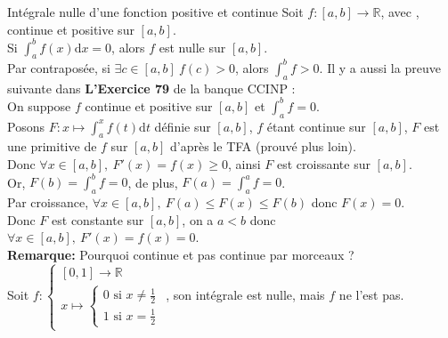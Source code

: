 \documentclass[11pt]{article}
\newcommand*{\R}{\mathbb{R}}
\newcommand{\0}{\varnothing}
\newcommand*{\n}{\\[0.2cm]}
\newcommand{\dx}{\textrm{d}x}
\newcommand{\dt}{\textrm{d}t}
\begin{document}
\begin{prop}{Intégrale nulle d'une fonction positive et continue}{}
    Soit $f:[a,b]\to\R$, avec , continue et positive sur $[a,b]$.\\
    Si $\int_a^bf(x)\dx=0$, alors $f$ est nulle sur $[a,b]$.\\
    Par contraposée, si $\exists c \in [a,b] ~ f(c)>0$, alors $\int_a^bf>0$.
    \tcblower
    Il y a aussi la preuve suivante dans \textbf{L'Exercice 79} de la banque CCINP :\\
    On suppose $f$ continue et positive sur $[a,b]$ et $\int_a^bf=0$.\\
    Posons $F:x\mapsto\int_a^xf(t)\dt$ définie sur $[a,b]$, $f$ étant continue sur $[a,b]$, $F$ est une primitive de $f$ sur $[a,b]$ d'après le TFA (prouvé plus loin).\\
    Donc $\forall x \in [a,b], ~ F'(x)=f(x)\geq0$, ainsi $F$ est croissante sur $[a,b]$.\\
    Or, $F(b)=\int_a^bf=0$, de plus, $F(a)=\int_a^af=0$.\\
    Par croissance, $\forall x \in [a,b], ~ F(a) \leq F(x)\leq F(b)$ donc $F(x)=0$.\\
    Donc $F$ est constante sur $[a,b]$, on a $a<b$ donc $\forall x\in[a,b], ~ F'(x)=f(x)=0$.
    \n\textbf{Remarque:} Pourquoi continue et pas continue par morceaux ?\\
    Soit $f:\begin{cases}[0,1]\to\R\\x\mapsto\begin{cases}0 \text{ si } x\neq\frac{1}{2}\\1 \text{ si } x=\frac{1}{2}\end{cases}\end{cases}$, son intégrale est nulle, mais $f$ ne l'est pas.
\end{prop}
\end{document}

